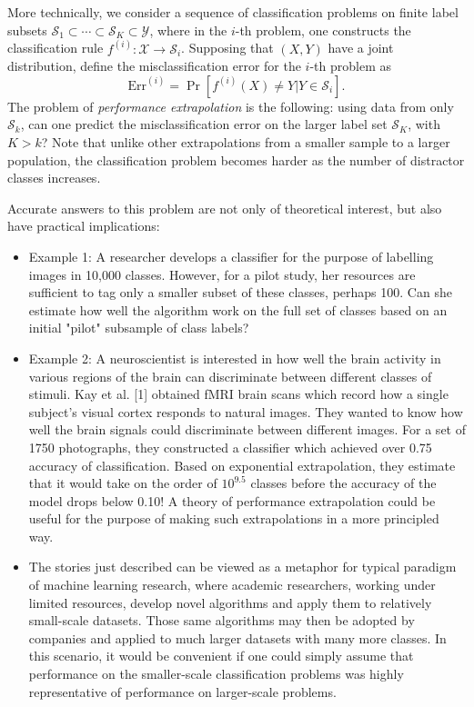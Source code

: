 \documentclass[12pt]{article}
\begin{document}
More technically, we consider a sequence of classification
problems on finite label subsets
$\mathcal{S}_1 \subset \cdots \subset \mathcal{S}_K \subset \mathcal{Y}$,
where in the $i$-th problem, one constructs the classification rule
$f^{(i)}:\mathcal{X} \to \mathcal{S}_i$.  Supposing that $(X, Y)$ have
a joint distribution, define the misclassification error for the
$i$-th problem as
\[
\text{Err}^{(i)} = \Pr[f^{(i)}(X) \neq Y|Y \in \mathcal{S}_i].
\]
The problem of \emph{performance extrapolation} is the following: using data
from only $\mathcal{S}_k$, can one predict the misclassification error
 on the larger label set $\mathcal{S}_K$, with $K> k$?
Note that unlike other
extrapolations from a smaller sample to a larger population, 
the classification problem becomes harder as the number of distractor classes
increases. 

Accurate answers to this 
problem are not only of theoretical interest, but also have practical implications:
\begin{itemize} 
\item Example 1: A researcher develops a classifier for the purpose of labelling
images in 10,000 classes. However, for a pilot study, her resources are sufficient to 
tag only a smaller subset of these classes, perhaps 100. Can she estimate how well the algorithm 
work on the full set of classes based on an initial "pilot" subsample of class labels?
\item Example 2: A neuroscientist is interested in how well the brain activity 
in various regions of the brain can discriminate between different classes of stimuli.
Kay et al. [1] obtained fMRI brain scans which record how a single
subject's visual cortex responds to natural images. They wanted to know how 
well the brain signals could discriminate between different images. For a set of 1750
photographs, they constructed a classifier which
achieved over 0.75 accuracy of classification. Based on
exponential extrapolation, they estimate that it would take on the
order of $10^{9.5}$ classes before the accuracy of the model drops
below 0.10!  A theory of performance extrapolation could be useful for
the purpose of making such extrapolations in a more principled way.
\item The stories just described can be viewed as a metaphor for typical
paradigm of machine learning research, where academic researchers,
working under limited resources, develop novel algorithms and apply
them to relatively small-scale datasets. Those same algorithms may
then be adopted by companies and applied to much larger datasets with
many more classes. In this scenario, it would be convenient if one
could simply assume that performance on the smaller-scale
classification problems was highly representative of performance on
larger-scale problems. 
\end{itemize}
\end{document}
